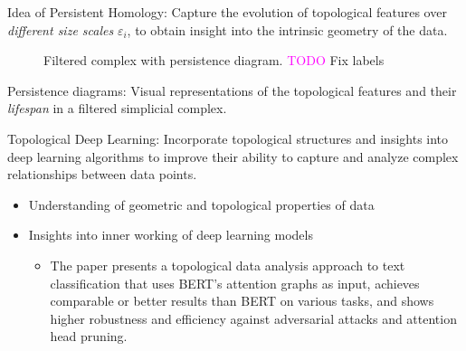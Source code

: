 \documentclass[11pt, a4paper]{amsart}
\begin{document}
Idea of Persistent Homology:
Capture the evolution of topological features over \emph{different size scales} $\varepsilon_{i}$, to obtain insight into the intrinsic geometry of the data.

\begin{figure}
	\centering
	\caption{
		Filtered complex with persistence diagram.
		\textcolor{magenta}{TODO} Fix labels
		\label{fig:persistence_diagram}
	}
\end{figure}

Persistence diagrams: 
Visual representations of the topological features and their \emph{lifespan} in a filtered simplicial complex.

Topological Deep Learning: 
Incorporate topological structures and insights into deep learning algorithms to improve their ability to capture and analyze complex relationships between data points.

\begin{itemize}
	\item Understanding of geometric and topological properties of data
	\item Insights into inner working of deep learning models
	\begin{itemize}
		\item The paper \cite{perez2022topological} presents a topological data analysis approach to text classification that uses BERT’s attention graphs as input, achieves comparable or better results than BERT on various tasks, and shows higher robustness and efficiency against adversarial attacks and attention head pruning.
		
	\end{itemize}
\end{itemize}
\end{document}
